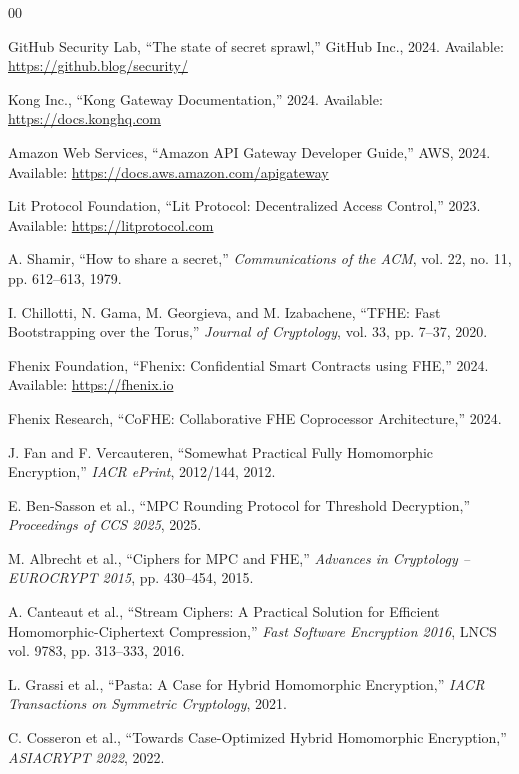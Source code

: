 \documentclass[conference]{IEEEtran}
\begin{document}
\begin{thebibliography}{00}

GitHub Security Lab, ``The state of secret sprawl,'' GitHub Inc., 2024.
Available: \url{https://github.blog/security/}

Kong Inc., ``Kong Gateway Documentation,'' 2024.
Available: \url{https://docs.konghq.com}

Amazon Web Services, ``Amazon API Gateway Developer Guide,'' AWS, 2024.
Available: \url{https://docs.aws.amazon.com/apigateway}

Lit Protocol Foundation, ``Lit Protocol: Decentralized Access Control,'' 2023.
Available: \url{https://litprotocol.com}

A. Shamir, ``How to share a secret,'' \textit{Communications of the ACM},
vol. 22, no. 11, pp. 612--613, 1979.

I. Chillotti, N. Gama, M. Georgieva, and M. Izabachene,
``TFHE: Fast Bootstrapping over the Torus,''
\textit{Journal of Cryptology}, vol. 33, pp. 7--37, 2020.

Fhenix Foundation, ``Fhenix: Confidential Smart Contracts using FHE,'' 2024.
Available: \url{https://fhenix.io}

Fhenix Research, ``CoFHE: Collaborative FHE Coprocessor Architecture,'' 2024.

J. Fan and F. Vercauteren,
``Somewhat Practical Fully Homomorphic Encryption,''
\textit{IACR ePrint}, 2012/144, 2012.

E. Ben-Sasson et al.,
``MPC Rounding Protocol for Threshold Decryption,''
\textit{Proceedings of CCS 2025}, 2025.

M. Albrecht et al.,
``Ciphers for MPC and FHE,''
\textit{Advances in Cryptology -- EUROCRYPT 2015},
pp. 430--454, 2015.

A. Canteaut et al.,
``Stream Ciphers: A Practical Solution for Efficient Homomorphic-Ciphertext Compression,''
\textit{Fast Software Encryption 2016},
LNCS vol. 9783, pp. 313--333, 2016.

L. Grassi et al.,
``Pasta: A Case for Hybrid Homomorphic Encryption,''
\textit{IACR Transactions on Symmetric Cryptology}, 2021.

C. Cosseron et al.,
``Towards Case-Optimized Hybrid Homomorphic Encryption,''
\textit{ASIACRYPT 2022}, 2022.


\end{thebibliography}
\end{document}
